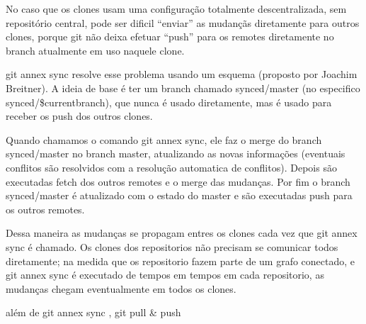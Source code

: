 No caso que os clones usam uma configuração totalmente
descentralizada, sem repositório central, pode ser dificil ``enviar''
as mudançãs diretamente para outros clones, porque git não deixa
efetuar ``push'' para os remotes diretamente no branch atualmente em
uso naquele clone.

git annex sync resolve esse problema usando um esquema (proposto por
Joachim Breitner). A ideia de base é ter um branch chamado
synced/master (no especifico synced/\$currentbranch), que nunca é
usado diretamente, mas é usado para receber os push dos outros clones.

Quando chamamos o comando git annex sync, ele faz o merge do branch
synced/master no branch master, atualizando as novas informações
(eventuais conflitos são resolvidos com a resolução automatica de
conflitos). Depois são executadas fetch dos outros remotes e o merge
das mudanças. Por fim o branch synced/master é atualizado com o estado
do master e são executadas push para os outros remotes.

Dessa maneira as mudanças se propagam entres os clones cada vez que
git annex sync é chamado. Os clones dos repositorios não precisam se
comunicar todos diretamente; na medida que os repositorio fazem parte
de um grafo conectado, e git annex sync é executado de tempos em
tempos em cada repositorio, as mudanças chegam eventualmente em todos
os clones.


além de git annex sync , git pull \& push




























